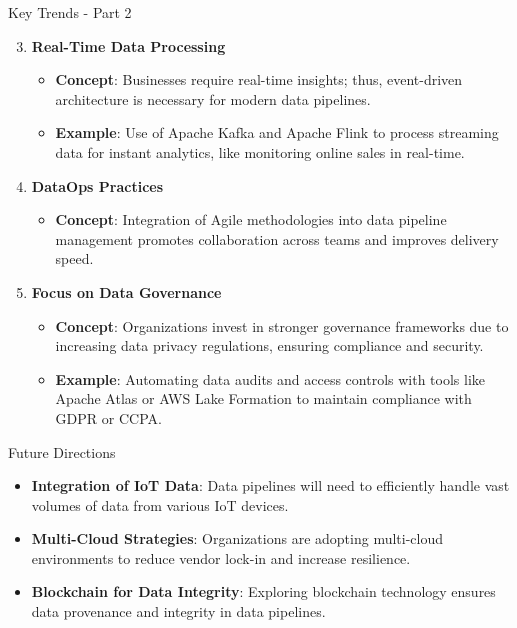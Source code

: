 \documentclass[aspectratio=169]{beamer}
\begin{document}
\begin{frame}{Key Trends - Part 2}
    \begin{enumerate}
        \setcounter{enumi}{2} %
        \item \textbf{Real-Time Data Processing}
            \begin{itemize}
                \item \textbf{Concept}: Businesses require real-time insights; thus, event-driven architecture is necessary for modern data pipelines.
                \item \textbf{Example}: Use of Apache Kafka and Apache Flink to process streaming data for instant analytics, like monitoring online sales in real-time.
            \end{itemize}
        
        \item \textbf{DataOps Practices}
            \begin{itemize}
                \item \textbf{Concept}: Integration of Agile methodologies into data pipeline management promotes collaboration across teams and improves delivery speed.
            \end{itemize}

        \item \textbf{Focus on Data Governance}
            \begin{itemize}
                \item \textbf{Concept}: Organizations invest in stronger governance frameworks due to increasing data privacy regulations, ensuring compliance and security.
                \item \textbf{Example}: Automating data audits and access controls with tools like Apache Atlas or AWS Lake Formation to maintain compliance with GDPR or CCPA.
            \end{itemize}
    \end{enumerate}
\end{frame}

\begin{frame}{Future Directions}
    \begin{itemize}
        \item \textbf{Integration of IoT Data}: Data pipelines will need to efficiently handle vast volumes of data from various IoT devices.
        \item \textbf{Multi-Cloud Strategies}: Organizations are adopting multi-cloud environments to reduce vendor lock-in and increase resilience.
        \item \textbf{Blockchain for Data Integrity}: Exploring blockchain technology ensures data provenance and integrity in data pipelines.
    \end{itemize}
\end{frame}
\end{document}
